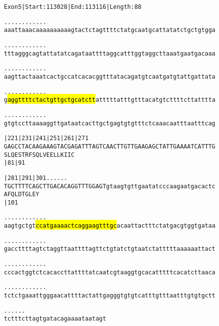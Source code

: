\documentclass{article}
\begin{document}
\begin{alltt}
Exon 5 | Start: 113028 | End: 113116 | Length: 88

.    .    .    .    .    .    .    .    .    .    .    .    
aaattaaacaaaaaaaaaagtactctagttttctatgcaatgcattatatctgctgtgga

.    .    .    .    .    .    .    .    .    .    .    .    
tttagggcagtattatatcagataattttaggcatttggtaggcttaaatgaatgacaaa

.    .    .    .    .    .    .    .    .    .    .    .    
aagttactaaatcactgccatcacacggtttatacagatgtcaatgatgtattgattata

.    .    .    .    .    .    .    .    .    .    .    .    
g\hl{aggttttctactgttgctgcatctt}atttttatttgtttacatgtcttttcttatttta

.    .    .    .    .    .    .    .    .    .    .    .    
gtgtccttaaaaggttgataatcacttgctgagtgtgtttctcaaacaatttaatttcag

        |221      |231      |241      |251      |261      |271
GAGCCTACAAGAAAGTACGAGATTTAGTCAACTTGTTGAAGAGCTATTGAAAATCATTTG
 S  L  Q  E  S  T  R  F  S  Q  L  V  E  E  L  L  K  I  I  C 
                            |81                           |91

        |281      |291      |301 .    .    .    .    .    . 
TGCTTTTCAGCTTGACACAGGTTTGGAGTgtaagtgttgaatatcccaagaatgacactc
 A  F  Q  L  D  T  G  L  E  Y                               
                            |101                            

   .    .    .    .    .    .    .    .    .    .    .    . 
aagtgctgt\hl{ccatgaaaactcaggaagtttgc}acaattactttctatgacgtggtgataa

   .    .    .    .    .    .    .    .    .    .    .    . 
gaccttttagtctaggttaattttagttctgtatctgtaatctatttttaaaaaattact

   .    .    .    .    .    .    .    .    .    .    .    . 
cccactggtctcacaccttattttatcaatcgtaaggtgcacatttttcacatcttaaca

   .    .    .    .    .    .    .    .    .    .    .    . 
tctctgaaattgggaacattttactattgagggtgtgtcatttgtttaatttgtgtgctt

   .    .    .    .    .    .
tctttcttagtgatacagaaaataatagt
\end{alltt}
\newpage
\end{document}
